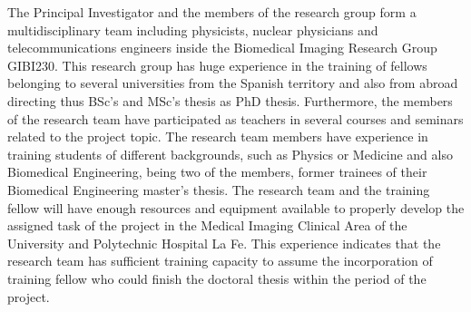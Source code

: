 The Principal Investigator and the members of the research group form a multidisciplinary team including physicists, nuclear physicians and telecommunications engineers inside the Biomedical Imaging Research Group GIBI230. This research group has huge experience in the training of fellows belonging to several universities from the Spanish territory and also from abroad directing thus BSc’s and MSc’s thesis as PhD thesis. Furthermore, the members of the research team have participated as teachers in several courses and seminars related to the project topic. 
The research team members have experience in training students of different backgrounds, such as Physics or Medicine and also Biomedical Engineering, being two of the members, former trainees of their Biomedical Engineering master’s thesis.
The research team and the training fellow will have enough resources and equipment available to properly develop the assigned task of the project in the Medical Imaging Clinical Area of the University and Polytechnic Hospital La Fe. 
This experience indicates that the research team has sufficient training capacity to assume the incorporation of training fellow who could finish the doctoral thesis within the period of the project. 
